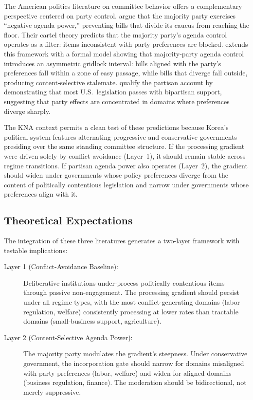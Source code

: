 \documentclass[11pt]{article}
\begin{document}
The American politics literature on committee behavior offers a complementary perspective centered on party control. \citet{cox2005} argue that the majority party exercises ``negative agenda power,'' preventing bills that divide its caucus from reaching the floor. Their cartel theory predicts that the majority party's agenda control operates as a filter: items inconsistent with party preferences are blocked. \citet{crosson2018} extends this framework with a formal model showing that majority-party agenda control introduces an asymmetric gridlock interval: bills aligned with the party's preferences fall within a zone of easy passage, while bills that diverge fall outside, producing content-selective stalemate. \citet{curry2019} qualify the partisan account by demonstrating that most U.S.\ legislation passes with bipartisan support, suggesting that party effects are concentrated in domains where preferences diverge sharply.

The KNA context permits a clean test of these predictions because Korea's political system features alternating progressive and conservative governments presiding over the same standing committee structure. If the processing gradient were driven solely by conflict avoidance (Layer~1), it should remain stable across regime transitions. If partisan agenda power also operates (Layer~2), the gradient should widen under governments whose policy preferences diverge from the content of politically contentious legislation and narrow under governments whose preferences align with it.

\subsection{Theoretical Expectations}

The integration of these three literatures generates a two-layer framework with testable implications:

\begin{description}
\item[Layer 1 (Conflict-Avoidance Baseline):] Deliberative institutions under-process politically contentious items through passive non-engagement. The processing gradient should persist under all regime types, with the most conflict-generating domains (labor regulation, welfare) consistently processing at lower rates than tractable domains (small-business support, agriculture).

\item[Layer 2 (Content-Selective Agenda Power):] The majority party modulates the gradient's steepness. Under conservative government, the incorporation gate should narrow for domains misaligned with party preferences (labor, welfare) and widen for aligned domains (business regulation, finance). The moderation should be bidirectional, not merely suppressive.
\end{description}
\end{document}
